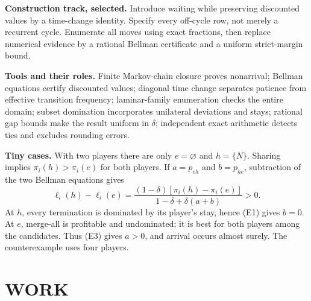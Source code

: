 \documentclass[11pt,a4paper]{article}
\theoremstyle{definition}\newtheorem{definition}[theorem]{Definition}
\theoremstyle{remark}\newtheorem{remark}[theorem]{Remark}
\newcommand{\1}{\mathbf 1}
\begin{document}
\textbf{Construction track, selected.} Introduce waiting while preserving discounted values by a time-change identity. Specify every off-cycle row, not merely a recurrent cycle. Enumerate all moves using exact fractions, then replace numerical evidence by a rational Bellman certificate and a uniform strict-margin bound.

\textbf{Tools and their roles.} Finite Markov-chain closure proves nonarrival; Bellman equations certify discounted values; diagonal time change separates patience from effective transition frequency; laminar-family enumeration checks the entire domain; subset domination incorporates unilateral deviations and stays; rational gap bounds make the result uniform in $\delta$; independent exact arithmetic detects ties and excludes rounding errors.

\textbf{Tiny cases.} With two players there are only $e=\varnothing$ and $h=\{N\}$. Sharing implies $\pi_i(h)>\pi_i(e)$ for both players. If $a=p_{eh}$ and $b=p_{he}$, subtraction of the two Bellman equations gives
\[
 \ell_i(h)-\ell_i(e)
 =\frac{(1-\delta)[\pi_i(h)-\pi_i(e)]}
 {1-\delta+\delta(a+b)}>0.
\]
At $h$, every termination is dominated by its player's stay, hence (E1) gives $b=0$. At $e$, merge-all is profitable and undominated; it is best for both players among the candidates. Thus (E3) gives $a>0$, and arrival occurs almost surely. The counterexample uses four players.

\section{WORK}
\end{document}
